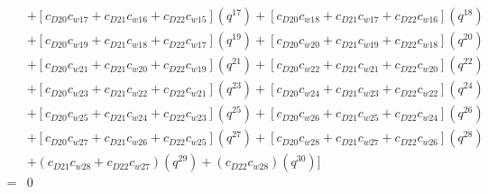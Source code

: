 \documentclass[12pt]{article}
\begin{document}
\begin{align}
    &+ [c_{D20}c_{w17} + c_{D21}c_{w16} + c_{D22}c_{w15}](q^{17}) + [c_{D20}c_{w18} + c_{D21}c_{w17} + c_{D22}c_{w16}](q^{18}) \nonumber\\
    &+ [c_{D20}c_{w19} + c_{D21}c_{w18} + c_{D22}c_{w17}](q^{19}) + [c_{D20}c_{w20} + c_{D21}c_{w19} + c_{D22}c_{w18}](q^{20}) \nonumber\\
    &+ [c_{D20}c_{w21} + c_{D21}c_{w20} + c_{D22}c_{w19}](q^{21}) + [c_{D20}c_{w22} + c_{D21}c_{w21} +  c_{D22}c_{w20}](q^{22}) \nonumber\\
    &+ [c_{D20}c_{w23} + c_{D21}c_{w22} + c_{D22}c_{w21}](q^{23}) + [c_{D20}c_{w24} + c_{D21}c_{w23} + c_{D22}c_{w22}](q^{24}) \nonumber\\
    &+ [c_{D20}c_{w25} + c_{D21}c_{w24} + c_{D22}c_{w23}](q^{25}) + [c_{D20}c_{w26} + c_{D21}c_{w25} + c_{D22}c_{w24}](q^{26}) \nonumber\\
    &+ [c_{D20}c_{w27} + c_{D21}c_{w26} + c_{D22}c_{w25}](q^{27}) + [c_{D20}c_{w28} + c_{D21}c_{w27} + c_{D22}c_{w26}](q^{28}) \nonumber\\
    &+ (c_{D21}c_{w28} + c_{D22}c_{w27})(q^{29}) + (c_{D22}c_{w28})(q^{30}) \Bigr] \nonumber\\
    =& 0
\end{align}
\end{document}
